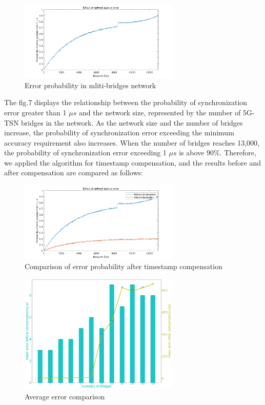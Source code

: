\documentclass[english]{cccconf}
\begin{document}
\begin{figure}[htbp]
	\centering
	\setcounter{figure}{6}
	\includegraphics[width=3in]{fig25.png}
	\caption{Error probability in mliti-bridges network}
\end{figure}
The fig.7 displays the relationship between the probability of synchronization error greater than 1 $\mu s$ and the network size, represented by the number of 5G-TSN bridges in the network. As the network size and the number of bridges increase, the probability of synchronization error exceeding the minimum accuracy requirement also increases. When the number of bridges reaches 13,000, the probability of synchronization error exceeding 1 $\mu s$ is above 90\%. Therefore, we applied the algorithm for timestamp compensation, and the results before and after compensation are compared as follows:
\begin{figure}[htbp]
	\centering
	\setcounter{figure}{7}
	\includegraphics[width=3in]{fig24.png}
	\caption{Comparison of error probability after timestamp compensation }
\end{figure}
\begin{figure}[htbp]
	\centering
	\setcounter{figure}{8}
	\includegraphics[width=3in]{fig23.png}
	\caption{Average error comparison}
\end{figure}
\end{document}
